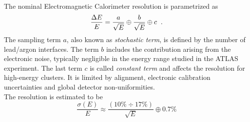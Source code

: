 \\
The nominal Electromagnetic Calorimeter resolution is parametrized as
\begin{equation}
\frac{\Delta E}{E} = \frac{a}{\sqrt{E}} \oplus \frac{b}{\sqrt{E}} \oplus c \hspace{0.2cm} \text{.}
\end{equation}
The sampling term $a$, also known as \emph{stochastic term}, is defined by the number of lead/argon interfaces. The term $b$ includes the contribution arising from the electronic noise, typically negligible in the energy range studied in the ATLAS experiment. The last term $c$ is called \emph{constant term} and affects the resolution for high-energy clusters. It is limited by alignment, electronic calibration uncertainties and global detector non-uniformities.
\\
The resolution is estimated to be
\begin{equation}
\frac{\sigma(E)}{E} \approx \frac{(10\% \div 17\%)}{\sqrt{E}} \oplus 0.7\%
\end{equation}

